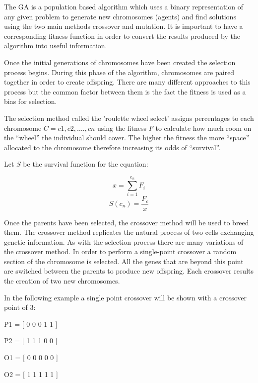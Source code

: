 \documentclass{AISB2008}
\begin{document}
The GA is a population based algorithm which uses a binary representation of any given problem to generate new chromosomes (agents) and find solutions using the two main methods crossover and mutation. It is important to have a corresponding fitness function in order to convert the results produced by the algorithm into useful information. 

Once the initial generations of chromosomes have been created the selection process begins. During this phase of the algorithm, chromosomes are paired together in order to create offspring. There are many different approaches to this process but the common factor between them is the fact the fitness is used as a bias for selection.

The selection method called the 'roulette wheel select' assigns percentages to each chromosome {$C = {c1,c2,….,cn}$} using the fitness {$F$} to calculate how much room on the “wheel” the individual should cover. The higher the fitness the more “space” allocated to the chromosome therefore increasing its odds of “survival”.

Let {$S$} be the survival function for the equation:

\begin{equation}
x = \sum\limits_{i=1}^{e_n} {F_i} 
\end{equation}
\begin{equation}
S(c_n) = \frac {F_c }{x}
\end{equation}

Once the parents have been selected, the crossover method will be used to breed them. The crossover method replicates the natural process of two cells exchanging genetic information. As with the selection process there are many variations of the crossover method. In order to perform a single-point crossover a random section of the chromosome is selected. All the genes that are beyond this point are switched between the parents to produce new offspring. Each crossover results the creation of two new chromosomes.

In the following example a single point crossover will be shown with a crossover point of 3:

\begin{center}
P1 = [ 0 0 0 {\color{red} 1 1}  ]
\end{center}
\begin{center}
P2 = [ 1 1 1 {\color{green} 0 0}  ]
\end{center}
\begin{center}
O1 = [ 0 0 0 {\color{green} 0 0}  ]
\end{center}
\begin{center}
O2 = [ 1 1 1 {\color{red} 1 1}  ]
\end{center}
\end{document}

